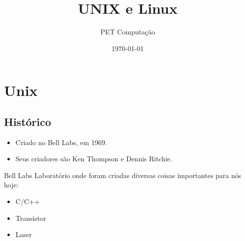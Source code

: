\documentclass{beamer}
\title{UNIX e Linux}
\author{PET Computação}
\institute{Universidade Federal de Santa Catarina}
\date{\today}
\begin{document}
\maketitle

\section{Unix}
\subsection{Histórico}

\begin{frame}

  \begin{itemize}
  \item Criado no Bell Labs, em 1969.
  \item Seus criadores são Ken Thompson e Dennis Ritchie.
  \end{itemize}

  \begin{block}{Bell Labs}
    Laboratório onde foram criadas diversas coisas importantes para
    nós hoje:
    \begin{itemize}
    \item C/C++
    \item Transistor
    \item Laser
    \end{itemize}
  \end{block}

\end{frame}
\end{document}
